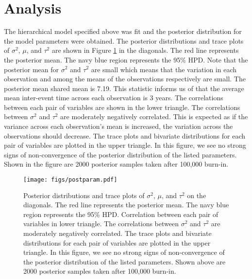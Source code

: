 \documentclass{../../tex_template/asaproc}
\begin{document}
\section{Analysis}
The hierarchical model specified above was fit and the posterior distribution
for the model parameters were obtained. The posterior distributions and trace
plots of $\sigma^2$, $\mu$, and $\tau^2$ are shown in Figure
\ref{fig:postparam} in the diagonals. The red line represents the posterior
mean. The navy blue region represents the 95\% HPD. Note that the posterior
mean for $\sigma^2$ and $\tau^2$ are small which means that the variation in
each observation and among the means of the observations respectively are
small. The posterior mean shared mean is 7.19. This statistic informs us of
that the average mean inter-event time across each observation is 3 years. The
correlations between each pair of variables are shown in the lower triangle.
The correlations between $\sigma^2$ and $\tau^2$ are moderately negatively
correlated. This is expected as if the variance across each observation's mean
is increased, the variation across the observations should decrease. The trace
plots and bivariate distributions for each pair of variables are plotted in the
upper triangle. In this figure, we see no strong signs of non-convergence of
the posterior distribution of the listed parameters. Shown in the figure are
2000 posterior samples taken after 100,000 burn-in.

\begin{figure}[H]
  \texttt{[image: figs/postparam.pdf]}
  \caption{\small Posterior distributions and trace plots of $\sigma^2$, $\mu$, and
    $\tau^2$ on the diagonals. The red line represents the posterior mean. The
    navy blue region represents the 95\% HPD.  Correlation between each pair of
    variables in lower triangle. The correlations between $\sigma^2$ and
    $\tau^2$ are moderately negatively correlated. The trace plots and
    bivariate distributions for each pair of variables are plotted in the upper
    triangle. In this figure, we see no strong signs of non-convergence of the
    posterior distribution of the listed parameters.  Shown above are 2000
    posterior samples taken after 100,000 burn-in.}
  \label{fig:postparam}
\end{figure}
\end{document}
